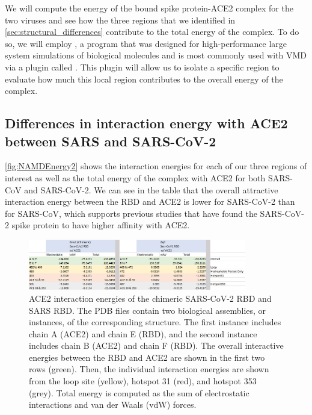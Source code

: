 We will compute the energy of the bound spike protein-ACE2 complex for the two viruses and see how the three regions that we identified in \autoref{sec:structural_differences} contribute to the total energy of the complex. To do so, we will employ \href{https://bit.ly/3uNv9gf}{}, a program that was designed for high-performance large system simulations of biological molecules and is most commonly used with VMD via a plugin called \href{https://bit.ly/367IOUZ}{}. This plugin will allow us to isolate a specific region to evaluate how much this local region contributes to the overall energy of the complex. 

\FloatBarrier
{}
\subsection{Differences in interaction energy with ACE2 between SARS and SARS-CoV-2}

\autoref{fig:NAMDEnergy2} shows the interaction energies for each of our three regions of interest as well as the total energy of the complex with ACE2 for both SARS-CoV and SARS-CoV-2. We can see in the table that the overall attractive interaction energy between the RBD and ACE2 is lower for SARS-CoV-2 than for SARS-CoV, which supports previous studies that have found the SARS-CoV-2 spike protein to have higher affinity with ACE2.\\

\begin{figure}[h]
	\centering
	\mySfFamily
	\includegraphics[width = 0.85\textwidth]{../images/NAMDEnergy2.png}
	\caption{ACE2 interaction energies of the chimeric SARS-CoV-2 RBD and SARS RBD. The PDB files contain two biological assemblies, or instances, of the corresponding structure. The first instance includes chain A (ACE2) and chain E (RBD), and the second instance includes chain B (ACE2) and chain F (RBD). The overall interactive energies between the RBD and ACE2 are shown in the first two rows (green). Then, the individual interaction energies are shown from the loop site (yellow), hotspot 31 (red), and hotspot 353 (grey). Total energy is computed as the sum of electrostatic interactions and van der Waals (vdW) forces.}
	\label{fig:NAMDEnergy2}
\end{figure}

